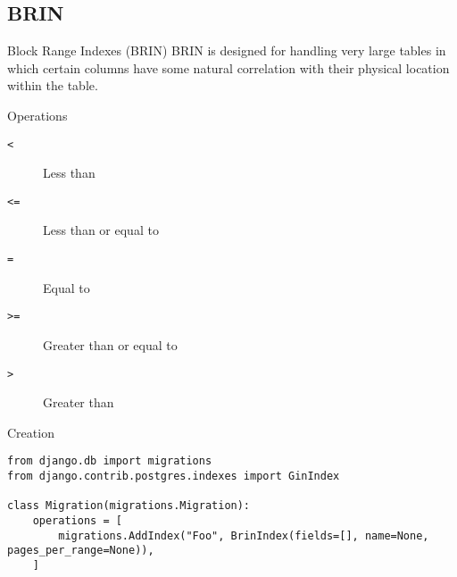 \subsection{BRIN}
\begin{frame}[fragile]{Block Range Indexes (BRIN)}
    BRIN is designed for handling very large tables in which certain columns have some natural correlation with their physical location within the table.

    \begin{block}{Operations}
        \begin{description}
            \item[\texttt{<}] Less than
            \item[\texttt{<}\texttt{=}] Less than or equal to
            \item[\texttt{=}] Equal to
            \item[\texttt{>}\texttt{=}] Greater than or equal to
            \item[\texttt{>}] Greater than
        \end{description}
    \end{block}

    \begin{block}{Creation}
        \begin{verbatim}
from django.db import migrations
from django.contrib.postgres.indexes import GinIndex

class Migration(migrations.Migration):
    operations = [
        migrations.AddIndex("Foo", BrinIndex(fields=[], name=None, pages_per_range=None)),
    ]
        \end{verbatim}
    \end{block}
\end{frame}
